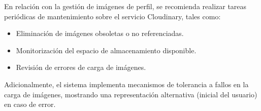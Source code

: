 En relación con la gestión de imágenes de perfil, se recomienda realizar tareas periódicas de mantenimiento sobre el servicio Cloudinary, tales como:

\begin{itemize}
    \item Eliminación de imágenes obsoletas o no referenciadas.
    \item Monitorización del espacio de almacenamiento disponible.
    \item Revisión de errores de carga de imágenes.
\end{itemize}

Adicionalmente, el sistema implementa mecanismos de tolerancia a fallos en la carga de imágenes, mostrando una representación alternativa (inicial del usuario) en caso de error.